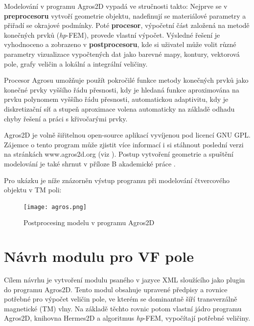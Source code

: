 \documentclass[12pt,a4paper,oneside]{article}
\numberwithin{equation}{section} %
\numberwithin{figure}{section} %
\numberwithin{table}{section} %
\begin{document}
Modelování v programu Agros2D vypadá ve stručnosti takto: Nejprve se v \textbf{preprocesoru} vytvoří geometrie objektu, nadefinují se materiálové parametry a přiřadí se okrajové podmínky. Poté \textbf{procesor}, výpočetní část založená na metodě konečných prvků (\textit{hp}-FEM), provede vlastní výpočet. Výsledné řešení je vyhodnoceno a zobrazeno v \textbf{postprocesoru}, kde si uživatel může volit různé parametry vizualizace vypočtených dat jako barevné mapy, kontury, vektorová pole, grafy veličin a lokální a integrální veličiny. 

Procesor Agrosu umožňuje použít pokročilé funkce metody konečných prvků jako konečné prvky vyššího řádu přesnosti, kdy je hledaná funkce aproximována na prvku polynomem vyššího řádu přesnosti, automatickou adaptivitu, kdy je diskretizační síť a stupeň aproximace volena automaticky na základě odhadu chyby řešení a práci s křivočarými prvky.

Agros2D je volně šiřitelnou open-source aplikací vyvíjenou pod licencí GNU GPL. Zájemce o tento program může zjistit více informací i si stáhnout poslední verzi na stránkách www.agros2d.org (viz \cite{Agros}). Postup vytvoření geometrie a spuštění modelování je také shrnut v příloze B akademické práce \cite{Koudela}.

Pro ukázku je níže znázorněn výstup programu při modelování čtvercového objektu v TM poli:
\begin{figure}[h] %
\begin{center}
\texttt{[image: agros.png]} %
\caption{Postprocesing modelu v programu Agros2D} %
\end{center}
\end{figure}



\newpage
\section{Návrh modulu pro VF pole}
Cílem návrhu je vytvoření modulu psaného v jazyce XML sloužícího jako plugin do programu Agros2D. Tento modul obsahuje upravené předpisy a rovnice potřebné pro výpočet veličin pole, ve kterém se dominantně šíří transverzálně magnetické (TM) vlny. Na základě těchto rovnic potom vlastní jádro programu Agros2D, knihovna Hermes2D a algoritmus \textit{hp}-FEM, vypočítají potřebné veličiny.
\end{document}
